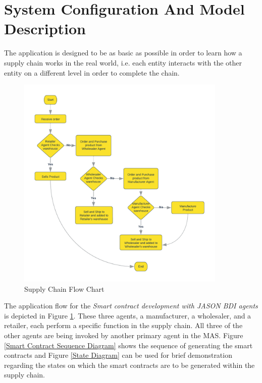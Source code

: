 \section{System Configuration And Model Description}

The application is designed to be as basic as possible in order to learn how a supply chain works in the real world, i.e. each entity interacts with the other entity on a different level in order to complete the chain.

    \begin{figure}[h]
    \centering
      \includegraphics[width=10cm]{includes/figures/Flow Chart.png}
      \caption{Supply Chain Flow Chart}
      \label{Flow chart}
    \end{figure}

\vspace{.5cm}

The application flow for the \textit{Smart contract development with JASON \ac{BDI} agents} is depicted in Figure  \ref{Flow chart}. These three agents, a manufacturer, a wholesaler, and a retailer, each perform a specific function in the supply chain. All three of the other agents are being invoked by another primary agent in the \ac{MAS}. Figure 
 \ref{Smart Contract Sequence Diagram}  shows the sequence of generating the smart contracts and Figure \ref{State Diagram} can be used for brief demonstration regarding the states on which the smart contracts are to be generated within the supply chain.

\vspace{.5cm}

